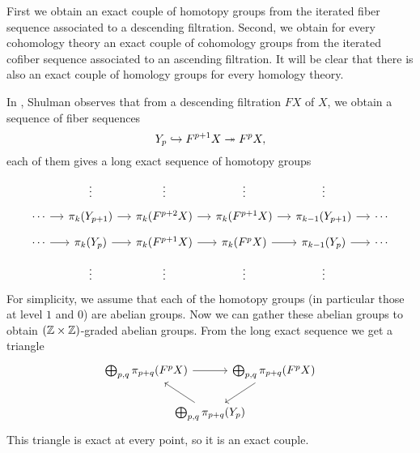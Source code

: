 \documentclass[reqno]{amsart}
\begin{document}
First we obtain an exact couple of homotopy groups
from the iterated fiber sequence associated to a descending filtration. Second,
we obtain for every cohomology theory an exact couple of cohomology groups from the iterated cofiber sequence
associated to an ascending filtration. It will be clear that there is also
an exact couple of homology groups for every homology theory.

In \cite{Shulman13Spectral}, Shulman observes that from a descending filtration 
$FX$ of $X$, we obtain a sequence of fiber sequences
\begin{equation*}
Y_p \hookrightarrow F^{p+1}X\twoheadrightarrow F^pX,
\end{equation*}
each of them gives a long exact sequence of homotopy groups
\begin{equation*}
\begin{tikzcd}[row sep=tiny,column sep=small]
& \vdots & \vdots & \vdots & \vdots \\
\cdots \arrow[r] & \pi_k(Y_{p+1}) \arrow[r] & \pi_k(F^{p+2}X) \arrow[r] & \pi_k(F^{p+1}X) \arrow[r] & \pi_{k-1}(Y_{p+1}) \arrow[r] & \cdots \\
\cdots \arrow[r] & \pi_k(Y_p) \arrow[r] & \pi_k(F^{p+1}X) \arrow[r] & \pi_k(F^pX) \arrow[r] & \pi_{k-1}(Y_p) \arrow[r] & \cdots \\
& \vdots & \vdots & \vdots & \vdots
\end{tikzcd}
\end{equation*}
For simplicity, we assume that each of the homotopy groups (in particular those
at level $1$ and $0$) are abelian groups. Now we can gather these abelian 
groups to obtain $(\mathbb{Z}\times \mathbb{Z})$-graded abelian groups. From the long exact
sequence we get a triangle
\begin{equation*}
\begin{tikzcd}[column sep=-2em]
\bigoplus_{p,q} \pi_{p+q}(F^pX) \arrow[rr] & & \bigoplus_{p,q} \pi_{p+q}(F^pX) \arrow[dl] \\
& \bigoplus_{p,q} \pi_{p+q}(Y_p) \arrow[ul]
\end{tikzcd}
\end{equation*}
This triangle is exact at every point, so it is an exact couple.
\end{document}

